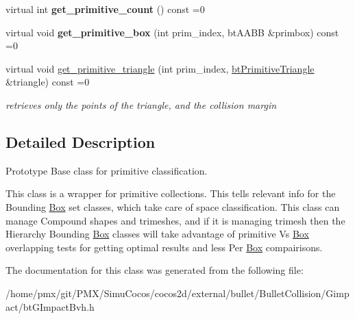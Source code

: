 \begin{DoxyCompactItemize}
\mbox{\label{classbtPrimitiveManagerBase_a9799cc93c1cf51471d22c5295f276ae8}} 
virtual int {\bfseries get\+\_\+primitive\+\_\+count} () const =0
\item 
\mbox{\label{classbtPrimitiveManagerBase_ac826409d978724f266d4e3453118de4e}} 
virtual void {\bfseries get\+\_\+primitive\+\_\+box} (int prim\+\_\+index, bt\+A\+A\+BB \&primbox) const =0
\item 
\mbox{\label{classbtPrimitiveManagerBase_a2eb95b960e4259da38c5ee4ac080fdf7}} 
virtual void \hyperlink{classbtPrimitiveManagerBase_a2eb95b960e4259da38c5ee4ac080fdf7}{get\+\_\+primitive\+\_\+triangle} (int prim\+\_\+index, \hyperlink{classbtPrimitiveTriangle}{bt\+Primitive\+Triangle} \&triangle) const =0
\begin{DoxyCompactList}\small\item\em retrieves only the points of the triangle, and the collision margin \end{DoxyCompactList}\end{DoxyCompactItemize}


\subsection{Detailed Description}
Prototype Base class for primitive classification. 

This class is a wrapper for primitive collections. This tells relevant info for the Bounding \hyperlink{classBox}{Box} set classes, which take care of space classification. This class can manage Compound shapes and trimeshes, and if it is managing trimesh then the Hierarchy Bounding \hyperlink{classBox}{Box} classes will take advantage of primitive Vs \hyperlink{classBox}{Box} overlapping tests for getting optimal results and less Per \hyperlink{classBox}{Box} compairisons. 

The documentation for this class was generated from the following file\+:\begin{DoxyCompactItemize}
\item 
/home/pmx/git/\+P\+M\+X/\+Simu\+Cocos/cocos2d/external/bullet/\+Bullet\+Collision/\+Gimpact/bt\+G\+Impact\+Bvh.\+h\end{DoxyCompactItemize}
